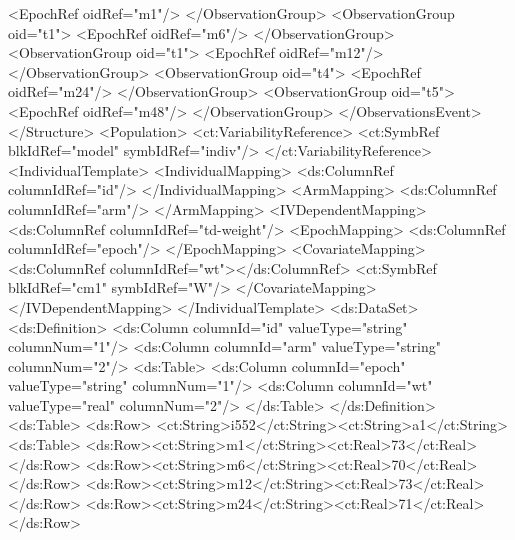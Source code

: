 \documentclass[a4paper,10pt]{article}
\begin{document}
\begin{xmlcode}
                    <EpochRef oidRef="m1"/>
                </ObservationGroup>
                <ObservationGroup oid="t1">
                    <EpochRef oidRef="m6"/>
                </ObservationGroup>
                <ObservationGroup oid="t1">
                    <EpochRef oidRef="m12"/>
                </ObservationGroup>
                <ObservationGroup oid="t4">
                    <EpochRef oidRef="m24"/>
                </ObservationGroup>
                <ObservationGroup oid="t5">
                    <EpochRef oidRef="m48"/>
                </ObservationGroup>
            </ObservationsEvent>
        </Structure>
        <Population>
            <ct:VariabilityReference>
                <ct:SymbRef blkIdRef="model" symbIdRef="indiv"/>
            </ct:VariabilityReference>
            <IndividualTemplate>
                <IndividualMapping>
                    <ds:ColumnRef columnIdRef="id"/>
                </IndividualMapping>
                <ArmMapping>
                    <ds:ColumnRef columnIdRef="arm"/>
                </ArmMapping>
                <IVDependentMapping>
                    <ds:ColumnRef columnIdRef="td-weight"/>
                    <EpochMapping>
                        <ds:ColumnRef columnIdRef="epoch"/>
                    </EpochMapping>
                    <CovariateMapping>
                        <ds:ColumnRef columnIdRef="wt"></ds:ColumnRef>
                        <ct:SymbRef blkIdRef="cm1" symbIdRef="W"/>
                    </CovariateMapping>
                </IVDependentMapping>
            </IndividualTemplate>
            <ds:DataSet>
                <ds:Definition>
                    <ds:Column columnId="id" valueType="string" columnNum="1"/>
                    <ds:Column columnId="arm" valueType="string" columnNum="2"/>
                    <ds:Table>
                        <ds:Column columnId="epoch" valueType="string" columnNum="1"/>
                        <ds:Column columnId="wt" valueType="real" columnNum="2"/>
                    </ds:Table>
                </ds:Definition>
                <ds:Table>
                    <ds:Row>
                        <ct:String>i552</ct:String><ct:String>a1</ct:String>
                            <ds:Table>
                                <ds:Row><ct:String>m1</ct:String><ct:Real>73</ct:Real></ds:Row>
                                <ds:Row><ct:String>m6</ct:String><ct:Real>70</ct:Real></ds:Row>
                                <ds:Row><ct:String>m12</ct:String><ct:Real>73</ct:Real></ds:Row>
                                <ds:Row><ct:String>m24</ct:String><ct:Real>71</ct:Real></ds:Row>

\end{xmlcode}
\end{document}
